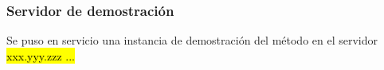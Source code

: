 %
\subsubsection{Servidor de demostración}
%
Se puso en servicio una instancia de demostración del método en el
servidor \hl{xxx.yyy.zzz ...}
